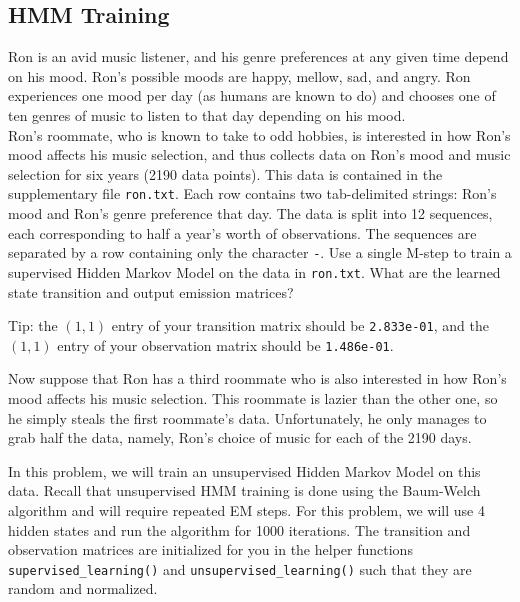 \begin{solution}
\end{solution}

\subsection{HMM Training}
Ron is an avid music listener, and his genre preferences at any given time depend on his mood. Ron's possible moods are happy, mellow, sad, and angry. Ron experiences one mood per day (as humans are known to do) and chooses one of ten genres of music to listen to that day depending on his mood. \\

Ron's roommate, who is known to take to odd hobbies, is interested in how Ron's mood affects his music selection, and thus collects data on Ron's mood and music selection for six years (2190 data points). This data is contained in the supplementary file \texttt{ron.txt}. Each row contains two tab-delimited strings: Ron's mood and Ron's genre preference that day. The data is split into 12 sequences, each corresponding to half a year's worth of observations. The sequences are separated by a row containing only the character \texttt{-}.
\noindent\problem[10] %
Use a single M-step to train a supervised Hidden Markov Model on the data in \texttt{ron.txt}. What are the learned state transition and output emission matrices?

Tip: the \((1,1)\) entry of your transition matrix should be \verb|2.833e-01|, and the \((1,1)\) entry of your observation matrix should be \verb|1.486e-01|.
\begin{solution}
\end{solution}
\indent\problem[15] %
Now suppose that Ron has a third roommate who is also interested in how Ron's mood affects his music selection. This roommate is lazier than the other one, so he simply steals the first roommate's data. Unfortunately, he only manages to grab half the data, namely, Ron's choice of music for each of the 2190 days.

In this problem, we will train an unsupervised Hidden Markov Model on this data. Recall that unsupervised HMM training is done using the Baum-Welch algorithm and will require repeated EM steps. For this problem, we will use 4 hidden states and run the algorithm for 1000 iterations. The transition and observation matrices are initialized for you in the helper functions \texttt{supervised\_learning()} and \texttt{unsupervised\_learning()} such that they are random and normalized.

